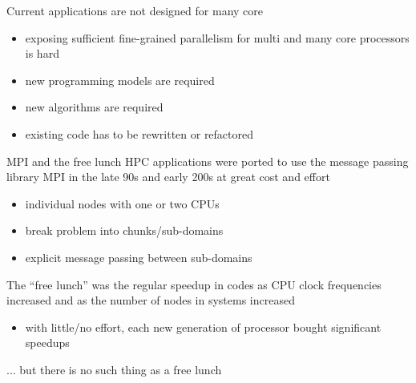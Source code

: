 \documentclass[aspectratio=43]{beamer}
\begin{document}
\begin{frame}[fragile]{}
    \begin{info}{Current applications are not designed for many core}
        \begin{itemize}
            \item exposing sufficient fine-grained parallelism for multi and many core processors is hard
            \item new programming models are required
            \item new algorithms are required
            \item existing code has to be rewritten or refactored
        \end{itemize}
    \end{info}
\end{frame}

\begin{frame}[fragile]{}
    \begin{info}{MPI and the free lunch}
        HPC applications were ported to use the message passing library MPI in the late 90s and early 200s at great cost and effort
        \begin{itemize}
            \item individual nodes with one or two CPUs
            \item break problem into chunks/sub-domains
            \item explicit message passing between sub-domains
        \end{itemize}
        The ``free lunch'' was the regular speedup in codes as CPU clock frequencies increased and as the number of nodes in systems increased
        \begin{itemize}
            \item with little/no effort, each new generation of processor bought significant speedups
        \end{itemize}
    \end{info}

    \centering ...  but there is no such thing as a free lunch
\end{frame}
\end{document}
